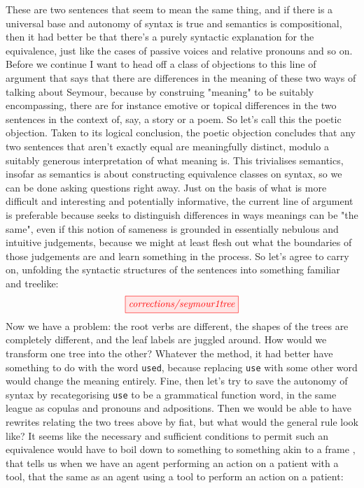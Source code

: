 These are two sentences that seem to mean the same thing, and if there is a universal base and autonomy of syntax is true and semantics is compositional, then it had better be that there's a purely syntactic explanation for the equivalence, just like the cases of passive voices and relative pronouns and so on. Before we continue I want to head off a class of objections to this line of argument that says that there are differences in the meaning of these two ways of talking about Seymour, because by construing "meaning" to be suitably encompassing, there are for instance emotive or topical differences in the two sentences in the context of, say, a story or a poem. So let's call this the poetic objection. Taken to its logical conclusion, the poetic objection concludes that any two sentences that aren't exactly equal are meaningfully distinct, modulo a suitably generous interpretation of what meaning is. This trivialises semantics, insofar as semantics is about constructing equivalence classes on syntax, so we can be done asking questions right away. Just on the basis of what is more difficult and interesting and potentially informative, the current line of argument is preferable because seeks to distinguish differences in ways meanings can be "the same", even if this notion of sameness is grounded in essentially nebulous and intuitive judgements, because we might at least flesh out what the boundaries of those judgements are and learn something in the process. So let's agree to carry on, unfolding the syntactic structures of the sentences into something familiar and treelike:
\[\tikzfig{corrections/seymour1tree}\]
Now we have a problem: the root verbs are different, the shapes of the trees are completely different, and the leaf labels are juggled around. How would we transform one tree into the other? Whatever the method, it had better have something to do with the word \texttt{used}, because replacing \texttt{use} with some other word would change the meaning entirely. Fine, then let's try to save the autonomy of syntax by recategorising \texttt{use} to be a grammatical function word, in the same league as copulas and pronouns and adpositions. Then we would be able to have rewrites relating the two trees above by fiat, but what would the general rule look like? It seems like the necessary and sufficient conditions to permit such an equivalence would have to boil down to something to something akin to a frame \citep{fillmoreFrameSemanticsText2001}, that tells us when we have an agent performing an action on a patient with a tool, that the same as an agent using a tool to perform an action on a patient:
